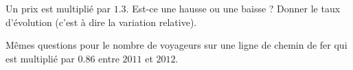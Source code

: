 
\begin{exercice}\label{exosmath-0116}

    Un prix est multiplié par \( 1.3\). Est-ce une hausse ou une baisse ? Donner le taux d'évolution (c'est à dire la variation relative).

    Mêmes questions pour le nombre de voyageurs sur une ligne de chemin de fer qui est multiplié par $0.86$ entre \( 2011\) et \( 2012\).

\end{exercice}

